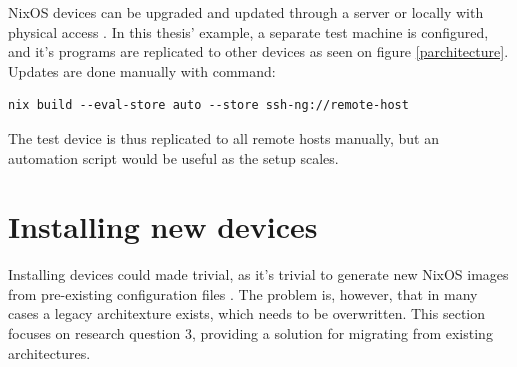 NixOS devices can be upgraded and updated through a server or locally with physical access \cite{nixosNixOSManual}. In this thesis' example, a separate test machine is configured, and it's programs are replicated to other devices as seen on figure \ref{parchitecture}. Updates are done manually with command:

\begin{lstlisting}
nix build --eval-store auto --store ssh-ng://remote-host
\end{lstlisting}

The test device is thus replicated to all remote hosts manually, but an automation script would be useful as the setup scales.

\section{Installing new devices} \label{instnewdevices}

Installing devices could made trivial, as it's trivial to generate new NixOS images from pre-existing configuration files \cite{nixosNixOSManual}. The problem is, however, that in many cases a legacy architexture exists, which needs to be overwritten. This section focuses on research question 3, providing a solution for migrating from existing architectures.

